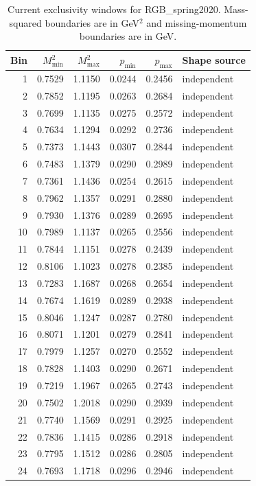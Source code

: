 \clearpage
\begin{longtable}{rrrrrl}
\caption{Current exclusivity windows for RGB\_spring2020. Mass-squared boundaries are in GeV$^2$ and missing-momentum boundaries are in GeV.}\\
\toprule Bin & $M^2_{\min}$ & $M^2_{\max}$ & $p_{\min}$ & $p_{\max}$ & Shape source\\\midrule\endhead
1 & 0.7529 & 1.1150 & 0.0244 & 0.2456 & independent\\
2 & 0.7852 & 1.1195 & 0.0263 & 0.2684 & independent\\
3 & 0.7699 & 1.1135 & 0.0275 & 0.2572 & independent\\
4 & 0.7634 & 1.1294 & 0.0292 & 0.2736 & independent\\
5 & 0.7373 & 1.1443 & 0.0307 & 0.2844 & independent\\
6 & 0.7483 & 1.1379 & 0.0290 & 0.2989 & independent\\
7 & 0.7361 & 1.1436 & 0.0254 & 0.2615 & independent\\
8 & 0.7962 & 1.1357 & 0.0291 & 0.2880 & independent\\
9 & 0.7930 & 1.1376 & 0.0289 & 0.2695 & independent\\
10 & 0.7989 & 1.1137 & 0.0265 & 0.2556 & independent\\
11 & 0.7844 & 1.1151 & 0.0278 & 0.2439 & independent\\
12 & 0.8106 & 1.1023 & 0.0278 & 0.2385 & independent\\
13 & 0.7283 & 1.1687 & 0.0268 & 0.2654 & independent\\
14 & 0.7674 & 1.1619 & 0.0289 & 0.2938 & independent\\
15 & 0.8046 & 1.1247 & 0.0287 & 0.2780 & independent\\
16 & 0.8071 & 1.1201 & 0.0279 & 0.2841 & independent\\
17 & 0.7979 & 1.1257 & 0.0270 & 0.2552 & independent\\
18 & 0.7828 & 1.1403 & 0.0290 & 0.2671 & independent\\
19 & 0.7219 & 1.1967 & 0.0265 & 0.2743 & independent\\
20 & 0.7502 & 1.2018 & 0.0290 & 0.2939 & independent\\
21 & 0.7740 & 1.1569 & 0.0291 & 0.2925 & independent\\
22 & 0.7836 & 1.1415 & 0.0286 & 0.2918 & independent\\
23 & 0.7795 & 1.1512 & 0.0286 & 0.2805 & independent\\
24 & 0.7693 & 1.1718 & 0.0296 & 0.2946 & independent\\
\bottomrule\end{longtable}
